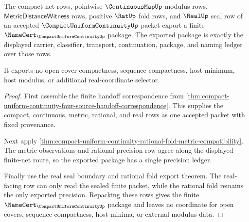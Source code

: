 \begin{theorem}
\label{thm:compact-uniform-continuity-compact-continuous-namecert-export}
The compact-net rows, pointwise $\ContinuousMapUp$ modulus rows, $\mathsf{MetricDistanceWitness}$ rows, positive $\RatUp$ fold rows, and $\RealUp$ seal row of an accepted $\CompactUniformContinuityUp$ packet export a finite $\NameCert_{\CompactUniformContinuityUp}$ package. The exported package is exactly the displayed carrier, classifier, transport, continuation, package, and naming ledger over those rows.

It exports no open-cover compactness, sequence compactness, host minimum, host modulus, or additional real-coordinate selector.
\end{theorem}
\begin{proof}
First assemble the finite handoff correspondence from \autoref{thm:compact-uniform-continuity-four-source-handoff-correspondence}. This supplies the compact, continuous, metric, rational, and real rows as one accepted packet with fixed provenance.

Next apply \autoref{thm:compact-uniform-continuity-rational-fold-metric-compatibility}. The metric observations and rational precision row agree along the displayed finite-net route, so the exported package has a single precision ledger.

Finally use the real seal boundary and rational fold export theorem. The real-facing row can only read the sealed finite packet, while the rational fold remains the only exported precision. Repacking these rows gives the finite $\NameCert_{\CompactUniformContinuityUp}$ package and leaves no coordinate for open covers, sequence compactness, host minima, or external modulus data.
\end{proof}

